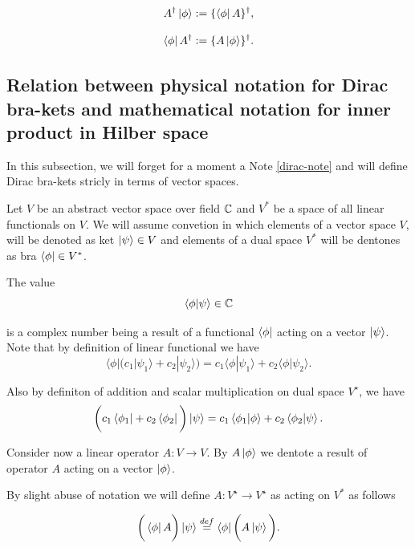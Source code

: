 \documentclass[main.tex]{subfiles}
\begin{document}
\begin{equation}
A^\dagger \ket{\phi}:= \{\bra{\phi}A\}^\dagger,
\end{equation}

\begin{equation}
\bra{\phi} A^\dagger:= \{A\ket{\phi}\}^\dagger.
\end{equation}

\subsection{Relation between physical notation for Dirac bra-kets and mathematical notation for inner product in Hilber space}

In this subsection, we will forget for a moment a Note \ref{dirac-note} and will define Dirac bra-kets stricly in terms of vector spaces.

Let $V$ be an abstract vector space over field $\mathbb{C}$ and $V^*$ be a space of all linear functionals on $V$. We will assume convetion in which elements of a vector space $V$, will be denoted as ket $\ket{\psi}\in V$ and elements of a dual space $V^*$ will be dentones as bra $\bra{\phi}\in V^*$.

The value
\begin{equation}
\bra{\phi}\ket{\psi} \in \mathbb{C}
\end{equation}

is a complex number being a result of a functional $\bra{\phi}$ acting on a vector $\ket{\psi}$. Note that by definition of linear functional we have
\begin{equation}
\langle\phi| \bigg( c_1|\psi_1\rangle + c_2|\psi_2\rangle \bigg) = c_1\langle\phi|\psi_1\rangle + c_2\langle\phi|\psi_2\rangle.
\end{equation}

Also by definiton of addition and scalar multiplication on dual space $V^\star$, we have
\begin{equation}
\bigg(c_1\bra{\phi_1} + c_2\bra{\phi_2} \bigg)\ket{\psi} = c_1\bra{\phi_1}\ket{\phi} + c_2\bra{\phi_2}\ket{\psi}.
\end{equation}

Consider now a linear operator $A:V\to V$. By $A\ket{\phi}$ we dentote a result of operator $A$ acting on a vector $\ket{\phi}$.

By slight abuse of notation we will define $A: V^\star\to V^\star$ as acting on $V^*$ as follows

\begin{equation}
\bigg(\bra{\phi}A \bigg)\ket{\psi} \stackrel{def}{=} \bra{\phi}\bigg( A\ket{\psi}\bigg).
\end{equation}\\
\end{document}
